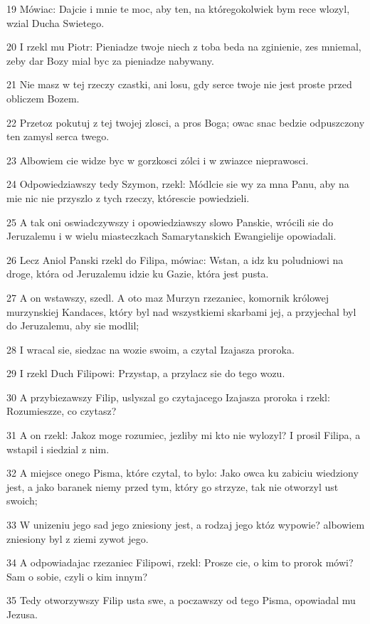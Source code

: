 \par 19 Mówiac: Dajcie i mnie te moc, aby ten, na któregokolwiek bym rece wlozyl, wzial Ducha Swietego.
\par 20 I rzekl mu Piotr: Pieniadze twoje niech z toba beda na zginienie, zes mniemal, zeby dar Bozy mial byc za pieniadze nabywany.
\par 21 Nie masz w tej rzeczy czastki, ani losu, gdy serce twoje nie jest proste przed obliczem Bozem.
\par 22 Przetoz pokutuj z tej twojej zlosci, a pros Boga; owac snac bedzie odpuszczony ten zamysl serca twego.
\par 23 Albowiem cie widze byc w gorzkosci zólci i w zwiazce nieprawosci.
\par 24 Odpowiedziawszy tedy Szymon, rzekl: Módlcie sie wy za mna Panu, aby na mie nic nie przyszlo z tych rzeczy, którescie powiedzieli.
\par 25 A tak oni oswiadczywszy i opowiedziawszy slowo Panskie, wrócili sie do Jeruzalemu i w wielu miasteczkach Samarytanskich Ewangielije opowiadali.
\par 26 Lecz Aniol Panski rzekl do Filipa, mówiac: Wstan, a idz ku poludniowi na droge, która od Jeruzalemu idzie ku Gazie, która jest pusta.
\par 27 A on wstawszy, szedl. A oto maz Murzyn rzezaniec, komornik królowej murzynskiej Kandaces, który byl nad wszystkiemi skarbami jej, a przyjechal byl do Jeruzalemu, aby sie modlil;
\par 28 I wracal sie, siedzac na wozie swoim, a czytal Izajasza proroka.
\par 29 I rzekl Duch Filipowi: Przystap, a przylacz sie do tego wozu.
\par 30 A przybiezawszy Filip, uslyszal go czytajacego Izajasza proroka i rzekl: Rozumieszze, co czytasz?
\par 31 A on rzekl: Jakoz moge rozumiec, jezliby mi kto nie wylozyl? I prosil Filipa, a wstapil i siedzial z nim.
\par 32 A miejsce onego Pisma, które czytal, to bylo: Jako owca ku zabiciu wiedziony jest, a jako baranek niemy przed tym, który go strzyze, tak nie otworzyl ust swoich;
\par 33 W unizeniu jego sad jego zniesiony jest, a rodzaj jego któz wypowie? albowiem zniesiony byl z ziemi zywot jego.
\par 34 A odpowiadajac rzezaniec Filipowi, rzekl: Prosze cie, o kim to prorok mówi? Sam o sobie, czyli o kim innym?
\par 35 Tedy otworzywszy Filip usta swe, a poczawszy od tego Pisma, opowiadal mu Jezusa.
